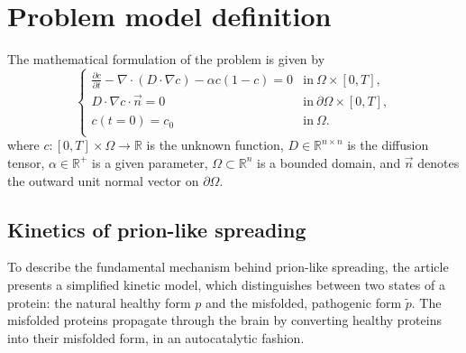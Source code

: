 \documentclass[12pt, a4paper, twoside, openright]{report}
\begin{document}
\chapter{Problem model definition}
The mathematical formulation of the problem is given by
\begin{equation} \label{fisher-kolmogorov}
  \begin{cases}
    \displaystyle
    \frac{\partial c}{\partial t} - \nabla \cdot (D \cdot \nabla c) - \alpha c(1-c) = 0 & \textrm{in} \ \Omega \times \left[0,T\right],          \\

    \displaystyle
    D \cdot \nabla c \cdot \vec{n} = 0                                                  & \textrm{in} \ \partial \Omega \times \left[0,T\right], \\

    \displaystyle
    c(t=0)=c_{0}                                                                        & \textrm{in} \ \Omega.                                  \\
  \end{cases}
\end{equation}
where $c : \left[0,T\right] \times \Omega \to \mathbb{R}$ is the unknown function,
$D \in \mathbb{R}^{n \times n}$ is the diffusion tensor,
$\alpha \in \mathbb{R}^{+}$ is a given parameter,
$\Omega \subset \mathbb{R}^n$ is a bounded domain, and
$\vec{n}$ denotes the outward unit normal vector on $\partial \Omega$.

\section{Kinetics of prion-like spreading}
To describe the fundamental mechanism behind prion-like
spreading, the article \cite{WEICKENMEIER2019264} presents a
simplified kinetic model, which distinguishes between two states
of a protein: the natural healthy form $p$ and the misfolded,
pathogenic form $\tilde{p}$. The misfolded proteins propagate
through the brain by converting healthy proteins into their
misfolded form, in an autocatalytic fashion.
\end{document}
